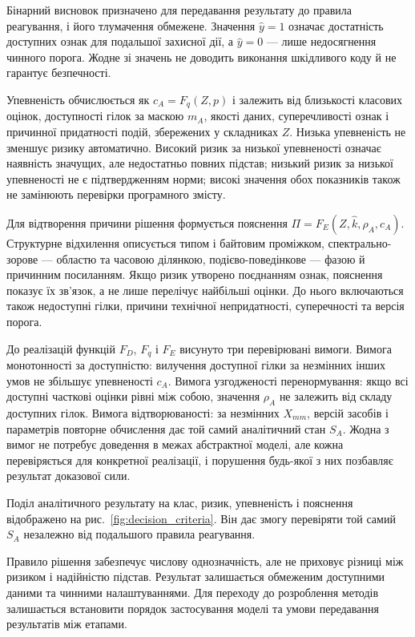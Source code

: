Бінарний висновок призначено для передавання результату до правила реагування, і його тлумачення обмежене. Значення $\hat y=1$ означає достатність доступних ознак для подальшої захисної дії, а $\hat y=0$ --- лише недосягнення чинного порога. Жодне зі значень не доводить виконання шкідливого коду й не гарантує безпечності.

Упевненість обчислюється як $c_A=F_q(Z,p)$ і залежить від близькості класових оцінок, доступності гілок за маскою $m_A$, якості даних, суперечливості ознак і причинної придатності подій, збережених у складниках $Z$. Низька упевненість не зменшує ризику автоматично. Високий ризик за низької упевненості означає наявність значущих, але недостатньо повних підстав; низький ризик за низької упевненості не є підтвердженням норми; високі значення обох показників також не замінюють перевірки програмного змісту.

Для відтворення причини рішення формується пояснення $\Pi=F_E(Z,\hat k,\rho_A,c_A)$. Структурне відхилення описується типом і байтовим проміжком, спектрально-зорове --- областю та часовою ділянкою, подієво-поведінкове --- фазою й причинним посиланням. Якщо ризик утворено поєднанням ознак, пояснення показує їх зв’язок, а не лише перелічує найбільші оцінки. До нього включаються також недоступні гілки, причини технічної непридатності, суперечності та версія порога.

До реалізацій функцій $F_D$, $F_q$ і $F_E$ висунуто три перевірювані вимоги. Вимога монотонності за доступністю: вилучення доступної гілки за незмінних інших умов не збільшує упевненості $c_A$. Вимога узгодженості перенормування: якщо всі доступні часткові оцінки рівні між собою, значення $\rho_A$ не залежить від складу доступних гілок. Вимога відтворюваності: за незмінних $X_{mm}$, версій засобів і параметрів повторне обчислення дає той самий аналітичний стан $S_A$. Жодна з вимог не потребує доведення в межах абстрактної моделі, але кожна перевіряється для конкретної реалізації, і порушення будь-якої з них позбавляє результат доказової сили.

Поділ аналітичного результату на клас, ризик, упевненість і пояснення відображено на рис.~\ref{fig:decision_criteria}. Він дає змогу перевіряти той самий $S_A$ незалежно від подальшого правила реагування.



Правило рішення забезпечує числову однозначність, але не приховує різниці між ризиком і надійністю підстав. Результат залишається обмеженим доступними даними та чинними налаштуваннями. Для переходу до розроблення методів залишається встановити порядок застосування моделі та умови передавання результатів між етапами.

